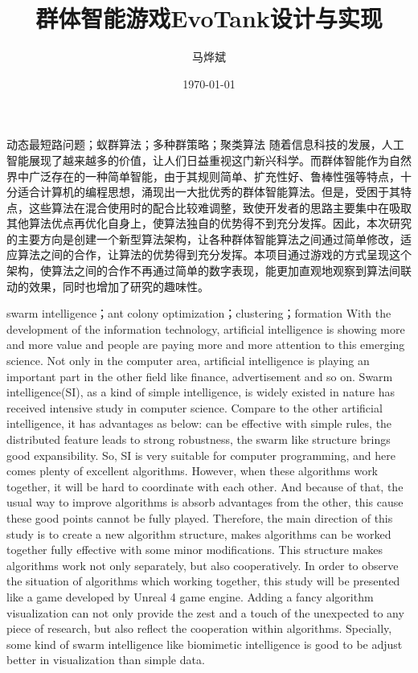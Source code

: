 \documentclass[twoside]{CUGThesis}
\title{群体智能游戏EvoTank设计与实现} %
\author{马烨斌} %
\date{\today} %
\begin{document}
\maketitle
\makestatement

\begin{cnabstract}{动态最短路问题；蚁群算法；多种群策略；聚类算法}
	随着信息科技的发展，人工智能展现了越来越多的价值，让人们日益重视这门新兴科学。而群体智能作为自然界中广泛存在的一种简单智能，由于其规则简单、扩充性好、鲁棒性强等特点，十分适合计算机的编程思想，涌现出一大批优秀的群体智能算法。但是，受困于其特点，这些算法在混合使用时的配合比较难调整，致使开发者的思路主要集中在吸取其他算法优点再优化自身上，使算法独自的优势得不到充分发挥。因此，本次研究的主要方向是创建一个新型算法架构，让各种群体智能算法之间通过简单修改，适应算法之间的合作，让算法的优势得到充分发挥。本项目通过游戏的方式呈现这个架构，使算法之间的合作不再通过简单的数字表现，能更加直观地观察到算法间联动的效果，同时也增加了研究的趣味性。
\end{cnabstract}

\begin{enabstract}{swarm intelligence；ant colony optimization；clustering；formation}
   	With the development of the information technology, artificial intelligence is showing more and more value and people are paying more and more attention to this emerging science. Not only in the computer area, artificial intelligence is playing an important part in the other field like finance, advertisement and so on. Swarm intelligence(SI), as a kind of simple intelligence, is widely existed in nature has received intensive study in computer science. Compare to the other artificial intelligence, it has advantages as below: can be effective with simple rules, the distributed feature leads to strong robustness, the swarm like structure brings good expansibility. So, SI is very suitable for computer programming, and here comes plenty of excellent algorithms. However, when these algorithms work together, it will be hard to coordinate with each other. And because of that, the usual way to improve algorithms is absorb advantages from the other, this cause these good points cannot be fully played. Therefore, the main direction of this study is to create a new algorithm structure, makes algorithms can be worked together fully effective with some minor modifications. This structure makes algorithms work not only separately, but also cooperatively. In order to observe the situation of algorithms which working together, this study will be presented like a game developed by Unreal 4 game engine. Adding a fancy algorithm visualization can not only provide the zest and a touch of the unexpected to any piece of research, but also reflect the cooperation within algorithms. Specially, some kind of swarm intelligence like biomimetic intelligence is good to be adjust better in visualization than simple data.
\end{enabstract}
\end{document}
